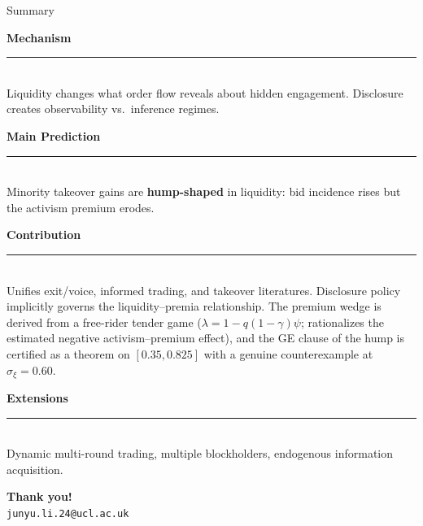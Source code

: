 \documentclass[aspectratio=169,10pt]{beamer}
\newcommand{\1}{\mathbf{1}}
\begin{document}
\begin{frame}{Summary}
\hypertarget{main:summary}{}
\footnotesize

\textbf{\textcolor{brightblue}{Mechanism}}\\[-0.2em]
{\rule{\linewidth}{0.4pt}}\\[0.1em]
Liquidity changes what order flow reveals about hidden engagement.
Disclosure creates observability vs.\ inference regimes.

\vspace{0.2em}

\textbf{\textcolor{brightblue}{Main Prediction}}\\[-0.2em]
{\rule{\linewidth}{0.4pt}}\\[0.1em]
Minority takeover gains are \textbf{hump-shaped} in liquidity:
bid incidence rises but the activism premium erodes.

\vspace{0.2em}

\textbf{\textcolor{brightblue}{Contribution}}\\[-0.2em]
{\rule{\linewidth}{0.4pt}}\\[0.1em]
Unifies exit/voice, informed trading, and takeover literatures.
Disclosure policy implicitly governs the liquidity--premia relationship.
The premium wedge is derived from a free-rider tender game
($\lambda = 1-q(1-\gamma)\psi$; rationalizes the estimated negative
activism--premium effect), and the GE clause of the hump is certified as a
theorem on $[0.35,0.825]$ with a genuine counterexample at $\sigma_\xi = 0.60$.

\vspace{0.2em}

\textbf{\textcolor{brightblue}{Extensions}}\\[-0.2em]
{\rule{\linewidth}{0.4pt}}\\[0.1em]
Dynamic multi-round trading, multiple blockholders, endogenous information acquisition.

\vspace{0.3em}
\centering
\textbf{Thank you!}\\[0.1em]
\texttt{junyu.li.24@ucl.ac.uk}
\end{frame}

\end{document}
